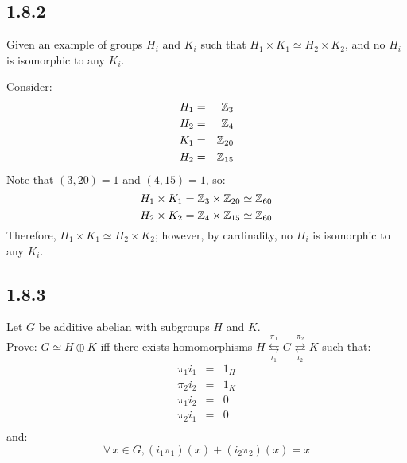 \documentclass[letterpaper,12pt,fleqn]{article}
\begin{document}
\subsection*{1.8.2}

Given an example of groups $H_i$ and $K_i$ such that
$H_1\times K_1\simeq H_2\times K_2$, and no $H_i$ is isomorphic to any $K_i$.

Consider:
\begin{eqnarray*}
  H_1 &=& \mathbb{Z}_3 \\
  H_2 &=& \mathbb{Z}_4 \\
  K_1 &=& \mathbb{Z}_{20} \\
  H_2 &=& \mathbb{Z}_{15} \\
\end{eqnarray*}
Note that $(3,20)=1$ and $(4,15)=1$, so:
\[H_1\times K_1=\mathbb{Z}_3\times\mathbb{Z}_{20}\simeq\mathbb{Z}_{60}\]
\[H_2\times K_2=\mathbb{Z}_4\times\mathbb{Z}_{15}\simeq\mathbb{Z}_{60}\]
Therefore, $H_1\times K_1\simeq H_2\times K_2$; however, by cardinality, no
$H_i$ is isomorphic to any $K_i$.

\subsection*{1.8.3}

\newcommand{\lr}[2]{\overset{#1}{\underset{#2}\rightleftarrows}}
\newcommand{\rl}[2]{\overset{#1}{\underset{#2}\leftrightarrows}}
\newcommand{\p}{\pi}
\newcommand{\h}{\phi}
\renewcommand{\i}{\iota}
\newcommand{\s}{\psi}
\newcommand{\n}{\mathrel{\triangleleft}}

Let $G$ be additive abelian with subgroups $H$ and $K$. \\
Prove: $G\simeq H\oplus K$ iff there exists homomorphisms
$H\rl{\p_1}{\i_1}G\lr{\p_2}{\i_2}K$ such that:
\begin{eqnarray*}
  \p_1i_1 &=& 1_H \\
  \p_2i_2 &=& 1_K \\
  \p_1i_2 &=& 0 \\
  \p_2i_1 &=& 0 \\
\end{eqnarray*}
and:
\[\forall\,x\in G,(i_1\p_1)(x)+(i_2\p_2)(x)=x\]
\end{document}
